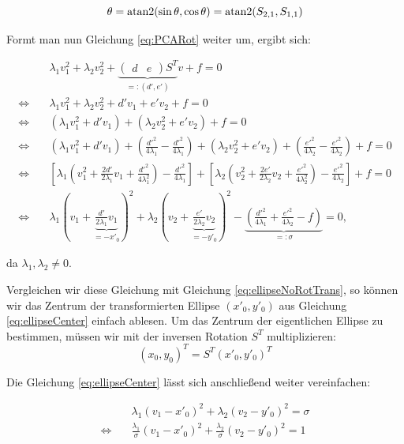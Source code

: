 \begin{equation*}
\theta = \text{atan2}(\sin\theta, \cos\theta) = \text{atan2}(S_{2,1}, S_{1,1})
\end{equation*}

Formt man nun Gleichung \ref{eq:PCARot} weiter um, ergibt sich:

\begin{equation}\label{eq:ellipseCenter}
\begin{aligned}
&\lambda_1v_1^2 + \lambda_2v_2^2 + \underbrace{\begin{pmatrix}d & e\end{pmatrix}S^T}_{=:(d', e')}v + f = 0 \\
\Leftrightarrow\quad &\lambda_1v_1^2 + \lambda_2v_2^2 + d'v_1 + e'v_2 + f = 0 \\
\Leftrightarrow\quad &(\lambda_1v_1^2 + d'v_1)+ (\lambda_2v_2^2 + e'v_2) + f = 0\\
\Leftrightarrow\quad &(\lambda_1v_1^2 + d'v_1) + (\frac{d'^2}{4\lambda_1} - \frac{d'^2}{4\lambda_1}) + (\lambda_2v_2^2 + e'v_2) + (\frac{e'^2}{4\lambda_2} - \frac{e'^2}{4\lambda_2}) + f = 0 \\
\Leftrightarrow\quad &\left[\lambda_1\left(v_1^2 + \frac{2d'}{2\lambda_1}v_1 + \frac{d'^2}{4\lambda_1^2}\right) - \frac{d'^2}{4\lambda_1}\right] +\left[\lambda_2\left(v_2^2 + \frac{2e'}{2\lambda_2}v_2 + \frac{e'^2}{4\lambda_2^2}\right) - \frac{e'^2}{4\lambda_2}\right] + f = 0 \\
\Leftrightarrow\quad &\lambda_1(v_1 + \underbrace{\frac{d'}{2\lambda_1}v_1}_{ = -x'_0})^2 +\lambda_2(v_2 + \underbrace{\frac{e'}{2\lambda_2}v_2}_{ = -y'_0})^2 - \underbrace{(\frac{d'^2}{4\lambda_1} + \frac{e'^2}{4\lambda_2} - f)}_{=:\sigma} = 0,
\end{aligned}
\end{equation}

da $\lambda_1, \lambda_2 \neq 0$. 

Vergleichen wir diese Gleichung mit Gleichung \ref{eq:ellipseNoRotTrans}, so können wir das Zentrum der transformierten Ellipse $(x'_0, y'_0)$ aus Gleichung \ref{eq:ellipseCenter} einfach ablesen. Um das Zentrum der eigentlichen Ellipse zu bestimmen, müssen wir mit der inversen Rotation $S^T$ multiplizieren:
\[
(x_0, y_0)^T = S^T(x'_0, y'_0)^T
\]

Die Gleichung \ref{eq:ellipseCenter} lässt sich anschließend weiter vereinfachen: 


\begin{equation} \label{eq:PCAKoeff}
\begin{aligned}
&\lambda_1(v_1 -x'_0)^2 +\lambda_2(v_2 -y'_0)^2 = \sigma \\
\Leftrightarrow\quad & \frac{\lambda_1}{\sigma}(v_1 -x'_0)^2 +\frac{\lambda_2}{\sigma}(v_2 -y'_0)^2  =1
\end{aligned}
\end{equation}

